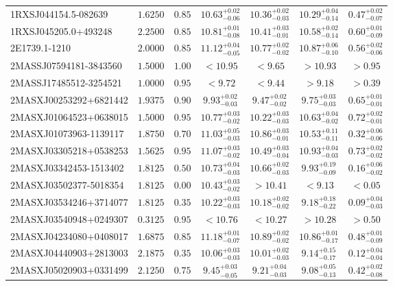 \documentclass[onecolumn]{mn2e}
\begin{document}
{\begin{center}
\begin{longtable}{lcccccc}
\hline \hline
\endfoot
1RXSJ044154.5-082639 & $1.6250$ & $0.85$ & $10.63_{-0.06}^{+0.02}$ & $10.36_{-0.03}^{+0.02}$ & $10.29_{-0.14}^{+0.04}$ &$0.47_{-0.07}^{+0.02}$ \\
1RXSJ045205.0+493248 & $2.2500$ & $0.85$ & $10.81_{-0.08}^{+0.01}$ & $10.41_{-0.01}^{+0.03}$ & $10.58_{-0.14}^{+0.02}$ &$0.60_{-0.09}^{+0.01}$ \\
2E1739.1-1210 & $2.0000$ & $0.85$ & $11.12_{-0.05}^{+0.04}$ & $10.77_{-0.02}^{+0.02}$ & $10.87_{-0.10}^{+0.06}$ &$0.56_{-0.06}^{+0.02}$ \\
2MASSJ07594181-3843560 & $1.5000$ & $1.00$ & $<10.95$ & $<9.65$ & $>10.93$ &$>0.95$ \\
2MASSJ17485512-3254521 & $1.0000$ & $0.95$ & $<9.72$ & $<9.44$ & $>9.18$ &$>0.39$ \\
2MASXJ00253292+6821442 & $1.9375$ & $0.90$ & $9.93_{-0.03}^{+0.02}$ & $9.47_{-0.02}^{+0.02}$ & $9.75_{-0.03}^{+0.03}$ &$0.65_{-0.01}^{+0.01}$ \\
2MASXJ01064523+0638015 & $1.5000$ & $0.95$ & $10.77_{-0.02}^{+0.03}$ & $10.22_{-0.03}^{+0.03}$ & $10.63_{-0.02}^{+0.04}$ &$0.72_{-0.01}^{+0.02}$ \\
2MASXJ01073963-1139117 & $1.8750$ & $0.70$ & $11.03_{-0.03}^{+0.05}$ & $10.86_{-0.01}^{+0.03}$ & $10.53_{-0.11}^{+0.11}$ &$0.32_{-0.06}^{+0.06}$ \\
2MASXJ03305218+0538253 & $1.5625$ & $0.95$ & $11.07_{-0.02}^{+0.03}$ & $10.49_{-0.04}^{+0.03}$ & $10.93_{-0.03}^{+0.04}$ &$0.73_{-0.02}^{+0.02}$ \\
2MASXJ03342453-1513402 & $1.8125$ & $0.50$ & $10.73_{-0.03}^{+0.04}$ & $10.66_{-0.03}^{+0.02}$ & $9.93_{-0.09}^{+0.19}$ &$0.16_{-0.02}^{+0.06}$ \\
2MASXJ03502377-5018354 & $1.8125$ & $0.00$ & $10.43_{-0.02}^{+0.03}$ & $>10.41$ & $<9.13$ &$<0.05$ \\
2MASXJ03534246+3714077 & $1.8125$ & $0.35$ & $10.22_{-0.03}^{+0.03}$ & $10.18_{-0.02}^{+0.02}$ & $9.18_{-0.22}^{+0.18}$ &$0.09_{-0.03}^{+0.04}$ \\
2MASXJ03540948+0249307 & $0.3125$ & $0.95$ & $<10.76$ & $<10.27$ & $>10.28$ &$>0.50$ \\
2MASXJ04234080+0408017 & $1.6875$ & $0.85$ & $11.18_{-0.07}^{+0.01}$ & $10.89_{-0.02}^{+0.02}$ & $10.86_{-0.17}^{+0.01}$ &$0.48_{-0.09}^{+0.01}$ \\
2MASXJ04440903+2813003 & $2.1875$ & $0.35$ & $10.06_{-0.03}^{+0.03}$ & $10.01_{-0.03}^{+0.02}$ & $9.14_{-0.17}^{+0.15}$ &$0.12_{-0.04}^{+0.04}$ \\
2MASXJ05020903+0331499 & $2.1250$ & $0.75$ & $9.45_{-0.05}^{+0.03}$ & $9.21_{-0.03}^{+0.04}$ & $9.08_{-0.13}^{+0.05}$ &$0.42_{-0.08}^{+0.02}$ \\

\end{longtable}
\end{center}}
\end{document}
